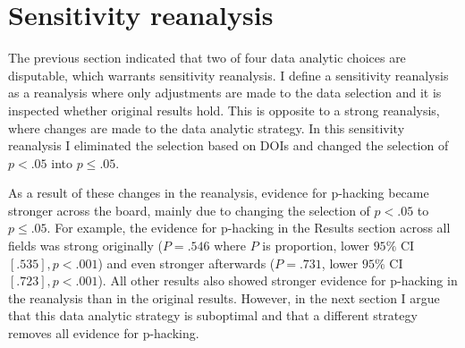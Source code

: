 \section*{Sensitivity reanalysis}
The previous section indicated that two of four data analytic choices are disputable, which warrants sensitivity reanalysis. I define a sensitivity reanalysis as a reanalysis where only adjustments are made to the data selection and it is inspected whether original results hold. This is opposite to a strong reanalysis, where changes are made to the data analytic strategy. In this sensitivity reanalysis I eliminated the selection based on DOIs and changed the selection of $p<.05$ into $p\leq.05$.

As a result of these changes in the reanalysis, evidence for p-hacking became stronger across the board, mainly due to changing the selection of $p<.05$ to $p\leq.05$. For example, the evidence for p-hacking in the Results section across all fields was strong originally ($P=.546$ where $P$ is proportion, lower $95\%$ CI $[.535],p<.001$) and even stronger afterwards ($P=.731$, lower $95\%$ CI $[.723],p<.001$). All other results also showed stronger evidence for p-hacking in the reanalysis than in the original results. However, in the next section I argue that this data analytic strategy is suboptimal and that a different strategy removes all evidence for p-hacking.